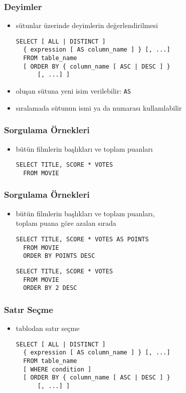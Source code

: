 \documentclass[dvipsnames]{beamer}
\theoremstyle{plain}
\begin{document}
\begin{frame}[fragile]
  \frametitle{Deyimler}

   \begin{itemize}
     \item sütunlar üzerinde deyimlerin değerlendirilmesi
    \begin{lstlisting}
SELECT [ ALL | DISTINCT ]
  { expression [ AS column_name ] } [, ...]
  FROM table_name
  [ ORDER BY { column_name [ ASC | DESC ] }
      [, ...] ]
    \end{lstlisting}

  \medskip
    \item oluşan sütuna yeni isim verilebilir: \lstinline!AS!
    \item sıralamada sütunun ismi ya da numarası kullanılabilir
  \end{itemize}
\end{frame}

\begin{frame}[fragile]
  \frametitle{Sorgulama Örnekleri}

  \begin{itemize}
    \item bütün filmlerin başlıkları ve toplam puanları
    \begin{lstlisting}
SELECT TITLE, SCORE * VOTES
  FROM MOVIE
    \end{lstlisting}
  \end{itemize}
\end{frame}

\begin{frame}[fragile]
  \frametitle{Sorgulama Örnekleri}

  \begin{itemize}
    \item bütün filmlerin başlıkları ve toplam puanları,\\
                toplam puana göre azalan sırada
    \begin{lstlisting}
SELECT TITLE, SCORE * VOTES AS POINTS
  FROM MOVIE
  ORDER BY POINTS DESC
    \end{lstlisting}

    \pause
    \begin{lstlisting}
SELECT TITLE, SCORE * VOTES
  FROM MOVIE
  ORDER BY 2 DESC
    \end{lstlisting}
  \end{itemize}
\end{frame}

\begin{frame}[fragile]
  \frametitle{Satır Seçme}

  \begin{itemize}
    \item tablodan satır seçme
    \begin{lstlisting}
SELECT [ ALL | DISTINCT ]
  { expression [ AS column_name ] } [, ...]
  FROM table_name
  [ WHERE condition ]
  [ ORDER BY { column_name [ ASC | DESC ] }
      [, ...] ]
    \end{lstlisting}
  \end{itemize}
\end{frame}
\end{document}
